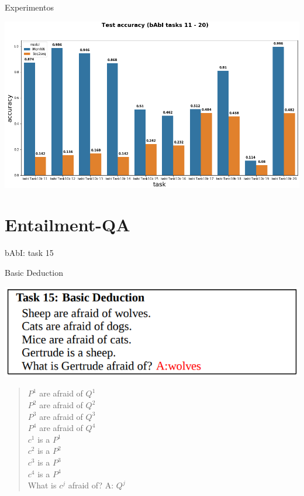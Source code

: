 \documentclass[10pt]{beamer}
\begin{document}
\begin{frame}{Experimentos}
\begin{center}
\includegraphics[scale=0.34]{images/comparative_results_babi2.png}
\end{center}
\end{frame}




\section{Entailment-QA}

\begin{frame}{bAbI: task 15}

\alert{Basic Deduction}

\begin{center}
\includegraphics[scale=0.28]{images/babi15.png}
\end{center}
\begin{quote} 
\centering 
$P^{1}$ are afraid of $Q^{1}$\\
$P^{2}$ are afraid of $Q^{2}$\\
$P^{3}$ are afraid of $Q^{3}$\\
$P^{4}$ are afraid of $Q^{4}$\\
$c^{1}$ is a $P^{1}$\\
$c^{2}$ is a $P^{2}$\\
$c^{3}$ is a $P^{3}$\\
$c^{4}$ is a $P^{4}$\\
What is $c^j$ afraid of? \alert{A: $Q^j$}\\
\end{quote}


\end{frame}
\end{document}
